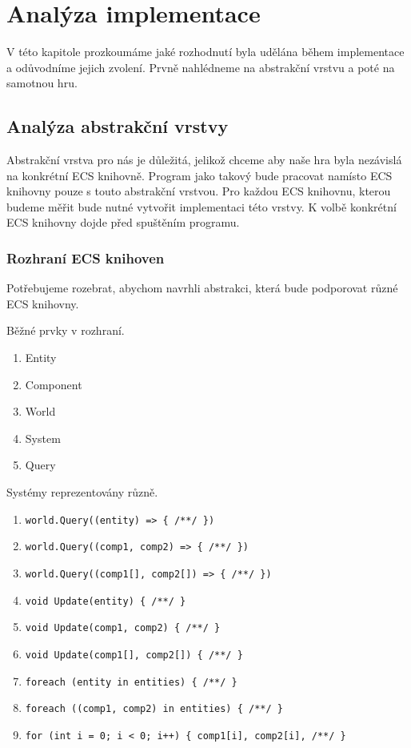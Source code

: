\chapter{Analýza implementace}
V této kapitole prozkoumáme jaké rozhodnutí byla udělána během implementace a odůvodníme jejich zvolení. Prvně nahlédneme na abstrakční vrstvu a poté na samotnou hru.

\section{Analýza abstrakční vrstvy}
Abstrakční vrstva pro nás je důležitá, jelikož chceme aby naše hra byla nezávislá na konkrétní ECS knihovně. Program jako takový bude pracovat namísto ECS knihovny pouze s touto abstrakční vrstvou. Pro každou ECS knihovnu, kterou budeme měřit bude nutné vytvořit implementaci této vrstvy. K volbě konkrétní ECS knihovny dojde před spuštěním programu.

\subsection{Rozhraní ECS knihoven}
Potřebujeme rozebrat, abychom navrhli abstrakci, která bude podporovat různé ECS knihovny.

Běžné prvky v rozhraní.

\begin{enumerate}
    \item Entity
    \item Component
    \item World
    \item System
    \item Query
\end{enumerate}

Systémy reprezentovány různě.

\begin{enumerate}
    \item \verb|world.Query((entity) => { /**/ })|
    \item \verb|world.Query((comp1, comp2) => { /**/ })|
    \item \verb|world.Query((comp1[], comp2[]) => { /**/ })|
    \item \verb|void Update(entity) { /**/ }|
    \item \verb|void Update(comp1, comp2) { /**/ }|
    \item \verb|void Update(comp1[], comp2[]) { /**/ }|
    \item \verb|foreach (entity in entities) { /**/ }|
    \item \verb|foreach ((comp1, comp2) in entities) { /**/ }|
    \item \verb|for (int i = 0; i < 0; i++) { comp1[i], comp2[i], /**/ }|
\end{enumerate}

